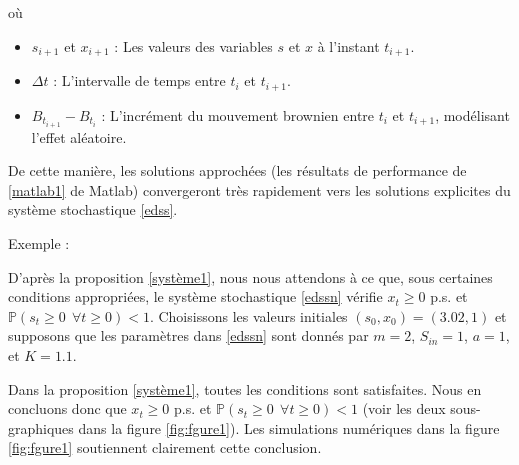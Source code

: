 \documentclass[12pt,a4paper]{report}%
\newcounter{proposition}[section] %
\newcounter{PP}[chapter]
\newenvironment{exemple}[2][]
  {\refstepcounter{PP}
  \begin{bclogo}[
    logo=\bccrayon , %
    couleur=white,
    arrondi=0.1,
    barre =snake,
     tailleOndu = 1.5,
    couleurBord=white,#1]{Exemple \thePP:#2}
  }
  {\end{bclogo}}
\begin{document}
où 
\begin{itemize}
	\item \( s_{i+1} \) et \( x_{i+1} \) : Les valeurs des variables \( s \) et \( x \) à l'instant \( t_{i+1} \).
	\item \( \Delta t \) : L'intervalle de temps entre \( t_i \) et \( t_{i+1} \).
	\item \( B_{t_{i+1}} - B_{t_i} \) : L'incrément du mouvement brownien entre \( t_i \) et \( t_{i+1} \), modélisant l'effet aléatoire.
\end{itemize}
De cette manière, les solutions approchées (les résultats de performance de \eqref{matlab1} de Matlab) convergeront très rapidement vers les solutions explicites du système stochastique \eqref{edss}.
\begin{exemple}{}
D'après la proposition \ref{système1}, nous nous attendons à ce que, sous certaines conditions appropriées, le système stochastique \eqref{edssn} vérifie \(x_t \geqslant 0\) p.s. et \(\mathbb{P}(s_t \geqslant 0 \;\, \forall t \geq 0) < 1\). Choisissons les valeurs initiales \((s_0, x_0) = (3.02, 1)\) et supposons que les paramètres dans \eqref{edssn} sont donnés par \(m = 2\), \(S_{in} = 1\), \(a = 1\), et \(K = 1.1\).

Dans la proposition \ref{système1}, toutes les conditions sont satisfaites. Nous en concluons donc que \(x_t \geqslant 0\) p.s. et \(\mathbb{P}(s_t \geqslant 0 \;\, \forall t \geq 0) < 1\) (voir les deux sous-graphiques dans la figure \ref{fig:fgure1}). Les simulations numériques dans la figure \ref{fig:fgure1} soutiennent clairement cette conclusion.
\end{exemple}
\end{document}
